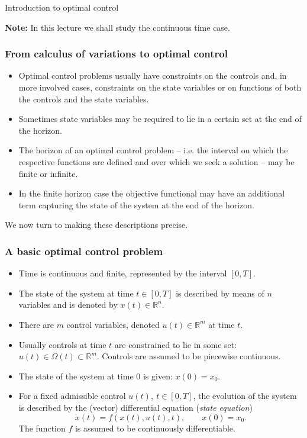 \documentclass[10pt]{beamer}
\theoremstyle{definition}
\begin{document}
\begin{section}{Introduction to optimal control}
\begin{frame}[fragile]
\textbf{Note:} In this lecture we shall study the continuous time case.
\end{frame}

\begin{frame}[fragile]
\frametitle{From calculus of variations to optimal control}
\begin{itemize}\itemsep1em
\item Optimal control problems usually have constraints on the controls and, in more involved cases, constraints on the state variables or on functions of both the controls and the state variables.
\item Sometimes state variables may be required to lie in a certain set at the end of the horizon.
\item The horizon of an optimal control problem -- i.e. the interval on which the respective functions are defined and over which we seek a solution -- may be finite or infinite.
\item In the finite horizon case the objective functional may have an additional term capturing the state of the system at the end of the horizon.
\end{itemize} \bigskip \pause

\alert{We now turn to making these descriptions precise.}
\end{frame}

\begin{frame}[fragile]
\frametitle{A basic optimal control problem}
\begin{itemize}\itemsep1em
\item Time is continuous and finite, represented by the interval $ [0,T] $.
\item The state of the system at time $ t \in [0,T] $ is described by means of $ n $ variables and is denoted by $ x(t)\in \mathbb{R}^n $.
\item There are $ m $ control variables, denoted $ u(t)\in \mathbb{R}^m $ at time $ t $. 
\item Usually controls at time $ t $ are constrained to lie in some set: $ u(t)\in \Omega (t) \subset \mathbb{R}^m $. Controls are assumed to be piecewise continuous.
\item The state of the system at time $ 0 $ is given: $ x(0)=x_0 $.
\item For a fixed admissible control $ u(t),~t\in [0,T] $, the evolution of the system is described by the (vector) differential equation (\emph{state equation})  \begin{equation}
\dot{x}(t)=f(x(t),u(t),t),\qquad x(0)=x_0.
\label{eq:state}
\end{equation} The function $ f $ is assumed to be continuously differentiable.
\end{itemize}
\end{frame}


\end{section}
\end{document}
